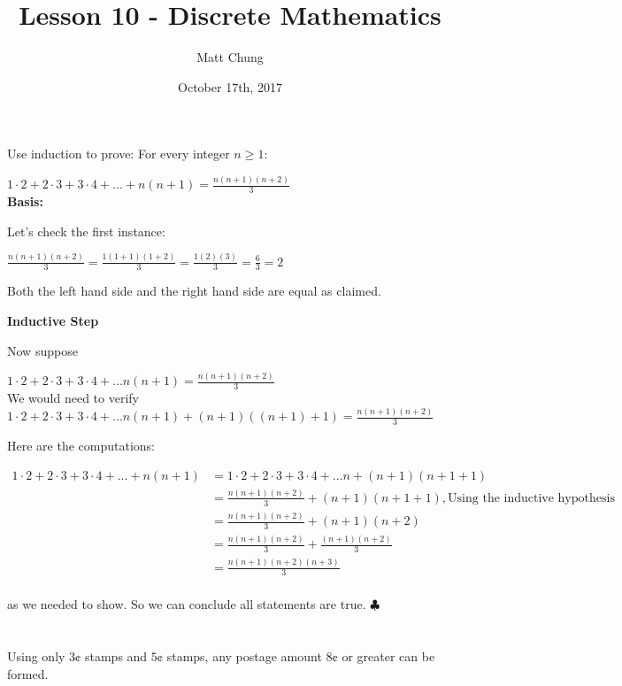 \documentclass{article}
\title{Lesson 10 - Discrete Mathematics}
\author{Matt Chung}
\date{October 17th, 2017}
\begin{document}
\maketitle

\section{}

Use induction to prove: For every integer $n \ge 1$: 

$1 \cdot 2 + 2 \cdot 3 + 3 \cdot 4 + ... + n(n+1) = \frac{n(n+1)(n+2)}{3}$\\

\textbf{Basis:}

Let's check the first instance:

$\frac{n(n+1)(n+2)}{3} = \frac{1(1 + 1)(1 + 2)}{3} = \frac{1(2)(3)}{3} = \frac{6}{3} = 2$

Both the left hand side and the right hand side are equal as claimed.

\textbf{Inductive Step} 

Now suppose

$1 \cdot 2 + 2 \cdot 3 + 3 \cdot 4 + ... n(n+1) = \frac{n(n+1)(n+2)}{3}$\\

We would need to verify 
$1 \cdot 2 + 2 \cdot 3 + 3 \cdot 4 + ... n(n+1) + (n+1)((n+1)+1) = \frac{n(n+1)(n+2)}{3}$

Here are the computations:

\begin{align*}
1 \cdot 2 + 2 \cdot 3 + 3 \cdot 4 + ... + n(n+1) &= 1 \cdot 2 + 2 \cdot 3 + 3 \cdot 4 + ... n + (n+1)(n + 1 +1) \\
                                               &= \frac{n(n+1)(n+2)}{3} + (n+1)(n+1+1), \text{Using the inductive hypothesis} \\
                                               &= \frac{n(n+1)(n+2)}{3} + (n+1)(n+2) \\
                                               &= \frac{n(n+1)(n+2)}{3} + \frac{(n+1)(n+2)}{3} \\
                                               &= \frac{n(n+1)(n+2)(n+3)}{3}\\
\end{align*}

as we needed to show. So we can conclude all statements are true. $\clubsuit$

\section{}
Using only $3\cent$ stamps and $5\cent$ stamps, any postage amount $8\cent$ or greater can be formed.
\end{document}
